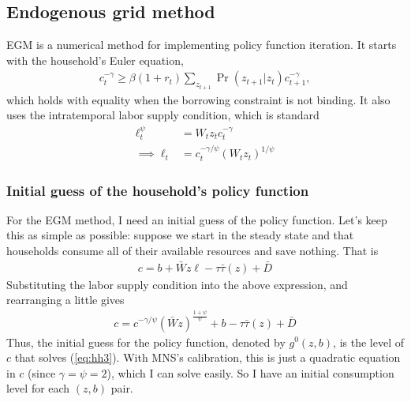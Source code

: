 \documentclass[12pt]{article}
\begin{document}
\subsection{Endogenous grid method}
EGM is a numerical method for implementing policy function iteration. It starts with the household's Euler equation,
\begin{align}
c_t^{-\gamma} \geq \beta(1+r_t) \sum_{z_{t+1}}\Pr(z_{t+1}|z_t)c_{t+1}^{-\gamma},  \label{eq:hh1}
\end{align}
which holds with equality when the borrowing constraint is not binding. It also uses the intratemporal labor supply condition, which is standard
\begin{align}
\ell_t^\psi &= W_tz_tc_t^{-\gamma}\nonumber \\
\implies  \ell_t&=c_t^{-\gamma/\psi}(W_tz_t)^{1/\psi}\label{eq:hh2}
\end{align}

\subsubsection{Initial guess of the household's policy function}
For the EGM method, I need an initial guess of the policy function. Let's keep this as simple as possible: suppose we start in the steady state and that households consume all of their available resources and save nothing. That is
\begin{align*}
c =  b + \bar Wz\ell - \tau\bar\tau(z) +\bar D
\end{align*}
Substituting the labor supply condition into the above expression, and rearranging a little gives
\begin{align}
c = c^{-\gamma/\psi}(\bar Wz)^{\frac{1+\psi}{\psi}}+ b - \tau\bar\tau(z) +\bar D \label{eq:hh3}
\end{align}
Thus, the initial guess for the policy function, denoted by $g^0(z,b)$, is the level of $c$ that solves (\ref{eq:hh3}). With MNS's calibration, this is just a quadratic equation in $c$ (since $\gamma=\psi=2$), which I can solve easily. So I have an initial consumption level for each $(z,b)$ pair.
\end{document}
